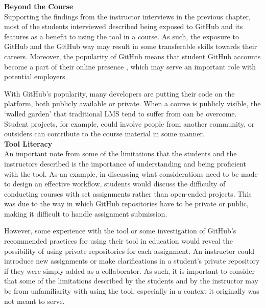 \textbf{Beyond the Course} \\
Supporting the findings from the instructor interviews in the previous chapter, most of the students interviewed described being exposed to GitHub and its features as a benefit to using the tool in a course. As such, the exposure to GitHub and the GitHub way may result in some transferable skills towards their careers. Moreover, the popularity of GitHub means that student GitHub accounts become a part of their online presence \cite{treude2012programming}, which may serve an important role with potential employers.

With GitHub's popularity, many developers are putting their code on the platform, both publicly available or private. When a course is publicly visible, the `walled garden' that traditional LMS tend to suffer from \cite{mott2010envisioning} can be overcome. Student projects, for example, could involve people from another community, or outsiders can contribute to the course material in some manner. \\

\textbf{Tool Literacy} \\
An important note from some of the limitations that the students and the instructors described is the importance of understanding and being proficient with the tool. As an example, in discussing what considerations need to be made to design an effective workflow, students would discuss the difficulty of conducting courses with set assignments rather than open-ended projects. This was due to the way in which GitHub repositories have to be private or public, making it difficult to handle assignment submission.

However, some experience with the tool or some investigation of GitHub's recommended practices for using their tool in education would reveal the possibility of using private repositories for each assignment. An instructor could introduce new assignments or make clarifications in a student's private repository if they were simply added as a collaborator. As such, it is important to consider that some of the limitations described by the students and by the instructor may be from unfamiliarity with using the tool, especially in a context it originally was not meant to serve.



